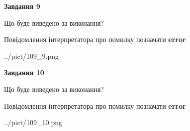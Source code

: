 \documentclass[12pt, ukrainian]{article}
\begin{document}
{{\begin {center}\textbf{Завдання 9}\end {center}}\par
Що буде виведено за виконання? \par
Повідомлення інтерпретатора про помилку позначати \textbf{error}

\begin{center}
	{../pict/109_9.png}
\end{center}
\newpage

{\begin {center}\textbf{Завдання 10}\end {center}}\par
Що буде виведено за виконання? \par
Повідомлення інтерпретатора про помилку позначати \textbf{error}

\begin{center}
	{../pict/109_10.png}
\end{center}
\newpage

}
\end{document}

